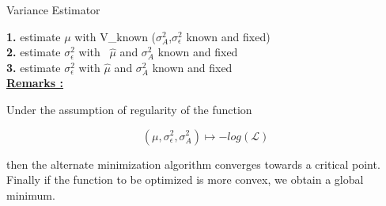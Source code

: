 \documentclass[unknownkeysallowed]{beamer}
\begin{document}
\begin{frame}{Variance Estimator}

\vspace{0.3cm}
    
\textbf{1.} estimate $\mu$ with V_{known} ($\sigma_{A}^{2}$,$\sigma_{\epsilon}^{2}$ known and fixed)\\
\vspace{0.5cm}
\textbf{2.} estimate $\sigma_{\epsilon}^{2}$ with \ $\widehat\mu$ and $\sigma_{A}^{2}$ known and fixed\\
\vspace{0.5cm}
\textbf{3.} estimate $\sigma_{\epsilon}^{2}$ with $\widehat\mu$ and $\sigma_{A}^{2}$ known and fixed\\
\vspace{0.5cm}
\underline{\textbf{Remarks :}}\\
\vspace{0.2cm}

Under the assumption of regularity of the function

$$(\mu,\sigma_{\epsilon}^{2},\sigma_{A}^{2}) \mapsto -log(\mathcal{L})$$

then the alternate minimization algorithm converges towards a critical point.
Finally if the function to be optimized is more convex, we obtain a global minimum.
\end{frame}
\end{document}
